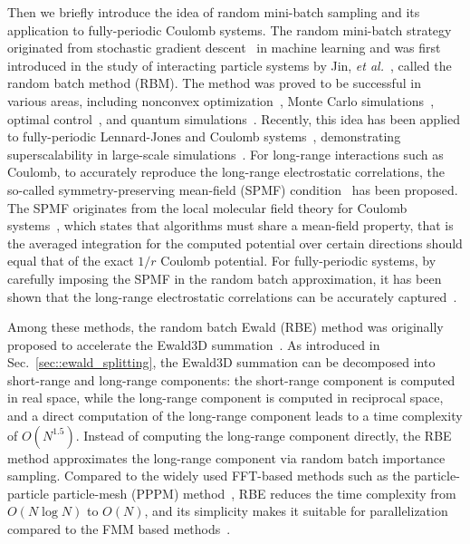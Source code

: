 Then we briefly introduce the idea of random mini-batch sampling and its application to fully-periodic Coulomb systems.
The random mini-batch strategy originated from stochastic gradient descent~\cite{robbins1951stochastic} in machine learning and was first introduced in the study of interacting particle systems by Jin, {\it et al.}~\cite{jin2020random}, called the random batch method (RBM).
The method was proved to be successful in various areas, including nonconvex optimization~\cite{ghadimi2016mini}, Monte Carlo simulations~\cite{li2020random}, optimal control~\cite{ko2021model}, and quantum simulations~\cite{jin2021randomquantum}. 
Recently, this idea has been applied to fully-periodic Lennard-Jones and Coulomb systems~\cite{liang2021random, jin2021random, liang2023SISC, chen2025random}, demonstrating superscalability in large-scale simulations~\cite{liang2022superscalability, liang2022improved,gao2024rbmdmoleculardynamicspackage}. 
For long-range interactions such as Coulomb, to accurately reproduce the long-range electrostatic correlations, the so-called symmetry-preserving mean-field (SPMF) condition~\cite{hu2014symmetry} has been proposed. 
The SPMF originates from the local molecular field theory for Coulomb systems~\cite{chen2006local, hu2010efficient}, which states that algorithms must share a mean-field property, that is
the averaged integration for the computed potential over certain directions should equal that of the exact $1/r$ Coulomb potential.
For fully-periodic systems, by carefully imposing the SPMF in the random batch approximation, it has been shown that the long-range electrostatic correlations can be accurately captured~\cite{gao2023JCTC}.

Among these methods, the random batch Ewald (RBE) method was originally proposed to accelerate the Ewald3D summation~\cite{jin2021random}.
As introduced in Sec.~\ref{sec::ewald_splitting}, the Ewald3D summation can be decomposed into short-range and long-range components: the short-range component is computed in real space, while the long-range component is computed in reciprocal space, and a direct computation of the long-range component leads to a time complexity of $O(N^{1.5})$.
Instead of computing the long-range component directly, the RBE method approximates the long-range component via random batch importance sampling.
Compared to the widely used FFT-based methods such as the particle-particle particle-mesh (PPPM) method~\cite{hockney2021computer,darden1993particle,essmann1995smooth}, RBE reduces the time complexity from $O(N\log N)$ to $O(N)$, and its simplicity makes it suitable for parallelization compared to the FMM based methods~\cite{greengard1987fast,cheng1999fast,ying2004kernel}.


